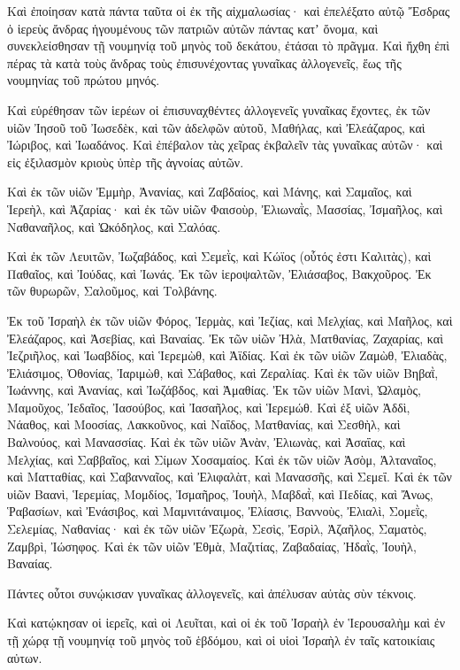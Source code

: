 {Καὶ ἐποίησαν κατὰ πάντα ταῦτα οἱ ἐκ τῆς αἰχμαλωσίας·
καὶ ἐπελέξατο αὐτῷ Ἔσδρας ὁ ἱερεὺς ἄνδρας ἡγουμένους τῶν πατριῶν αὐτῶν πάντας κατʼ ὄνομα, καὶ συνεκλείσθησαν τῇ νουμηνίᾳ τοῦ μηνὸς τοῦ δεκάτου, ἐτάσαι τὸ πρᾶγμα.
Καὶ ἤχθη ἐπὶ πέρας τὰ κατὰ τοὺς ἄνδρας τοὺς ἐπισυνέχοντας γυναῖκας ἀλλογενεῖς, ἕως τῆς νουμηνίας τοῦ πρώτου μηνός.
\par }{\PP {}Καὶ εὑρέθησαν τῶν ἱερέων οἱ ἐπισυναχθέντες ἀλλογενεῖς γυναῖκας ἔχοντες,
ἐκ τῶν υἱῶν Ἰησοῦ τοῦ Ἰωσεδὲκ, καὶ τῶν ἀδελφῶν αὐτοῦ, Μαθήλας, καὶ Ἐλεάζαρος, καὶ Ἰώριβος, καὶ Ἰωαδάνος.
Καὶ ἐπέβαλον τὰς χεῖρας ἐκβαλεῖν τὰς γυναῖκας αὐτῶν· καὶ εἰς ἐξιλασμὸν κριοὺς ὑπὲρ τῆς ἀγνοίας αὐτῶν.
\par }{\PP {}Καὶ ἐκ τῶν υἱῶν Ἐμμὴρ, Ἀνανίας, καὶ Ζαβδαίος, καὶ Μάνης, καὶ Σαμαῖος, καὶ Ἱερεὴλ, καὶ Ἀζαρίας·
καὶ ἐκ τῶν υἱῶν Φαισοὺρ, Ἐλιωναῒς, Μασσίας, Ἰσμαῆλος, καὶ Ναθαναῆλος, καὶ Ὠκόδηλος, καὶ Σαλόας.
\par }{\PP {}Καὶ ἐκ τῶν Λευιτῶν, Ἰωζαβάδος, καὶ Σεμεῒς, καὶ Κώϊος (οὗτός ἐστι Καλιτὰς), καὶ Παθαῖος, καὶ Ἰούδας, καὶ Ἰωνάς.
Ἐκ τῶν ἱεροψαλτῶν, Ἐλιάσαβος, Βακχοῦρος.
Ἐκ τῶν θυρωρῶν, Σαλοῦμος, καὶ Τολβάνης.
\par }{\PP {}Ἐκ τοῦ Ἰσραὴλ ἐκ τῶν υἱῶν Φόρος, Ἱερμὰς, καὶ Ἰεζίας, καὶ Μελχίας, καὶ Μαῆλος, καὶ Ἐλεάζαρος, καὶ Ἀσεβίας, καὶ Βαναίας.
Ἐκ τῶν υἱῶν Ἠλὰ, Ματθανίας, Ζαχαρίας, καὶ Ἰεζριῆλος, καὶ Ἰωαβδίος, καὶ Ἱερεμὼθ, καὶ Ἀϊδίας.
Καὶ ἐκ τῶν υἱῶν Ζαμὼθ, Ἐλιαδὰς, Ἐλιάσιμος, Ὀθονίας, Ἰαριμὼθ, καὶ Σάβαθος, καὶ Ζεραλίας.
Καὶ ἐκ τῶν υἱῶν Βηβαῒ, Ἰωάννης, καὶ Ἀνανίας, καὶ Ἰωζάβδος, καὶ Ἀμαθίας.
Ἐκ τῶν υἱῶν Μανὶ, Ὠλαμὸς, Μαμοῦχος, Ἰεδαῖος, Ἰασούβος, καὶ Ἰασαῆλος, καὶ Ἱερεμώθ.
Καὶ ἐξ υἱῶν Ἀδδὶ, Νάαθος, καὶ Μοοσίας, Λακκοῦνος, καὶ Ναΐδος, Ματθανίας, καὶ Σεσθὴλ, καὶ Βαλνούος, καὶ Μανασσίας.
Καὶ ἐκ τῶν υἱῶν Ἀνὰν, Ἐλιωνὰς, καὶ Ἀσαΐας, καὶ Μελχίας, καὶ Σαββαῖος, καὶ Σίμων Χοσαμαίος.
Καὶ ἐκ τῶν υἱῶν Ἀσὸμ, Ἀλταναῖος, καὶ Ματταθίας, καὶ Σαβανναῖος, καὶ Ἐλιφαλὰτ, καὶ Μανασσῆς, καὶ Σεμεΐ.
Καὶ ἐκ τῶν υἱῶν Βαανὶ, Ἱερεμίας, Μομδίος, Ἰσμαῆρος, Ἰουὴλ, Μαβδαῒ, καὶ Πεδίας, καὶ Ἄνως, Ῥαβασίων, καὶ Ἐνάσιβος, καὶ Μαμνιτάναιμος, Ἐλίασις, Βαννοὺς, Ἐλιαλὶ, Σομεῒς, Σελεμίας, Ναθανίας· καὶ ἐκ τῶν υἱῶν Ἐζωρὰ, Σεσὶς, Ἐσρὶλ, Ἀζαῆλος, Σαματὸς, Ζαμβρὶ, Ἰώσηφος.
Καὶ ἐκ τῶν υἱῶν Ἐθμὰ, Μαζιτίας, Ζαβαδαίας, Ἠδαῒς, Ἰουὴλ, Βαναίας.
\par }{\PP {}Πάντες οὗτοι συνῴκισαν γυναῖκας ἀλλογενεῖς, καὶ ἀπέλυσαν αὐτὰς σὺν τέκνοις.
\par }{\PP {}Καὶ κατῴκησαν οἱ ἱερεῖς, καὶ οἱ Λευῖται, καὶ οἱ ἐκ τοῦ Ἰσραὴλ ἐν Ἱερουσαλὴμ καὶ ἐν τῇ χώρᾳ τῇ νουμηνίᾳ τοῦ μηνὸς τοῦ ἑβδόμου, καὶ οἱ υἱοὶ Ἰσραὴλ ἐν ταῖς κατοικίαις αὐτων.
}
